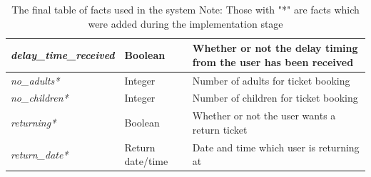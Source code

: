 \documentclass[11pt]{article}
\begin{document}
\begin{appendices}
\begin{table}[!ht]
{\begin{tabular}{|l|l|l|}
\textit{delay\_time\_received}  & Boolean                     & Whether or not the delay timing from the user has been received      \\ \hline
\textit{no\_adults*}            & Integer                     & Number of adults for ticket booking                                  \\ \hline
\textit{no\_children*}          & Integer                     & Number of children for ticket booking                                \\ \hline
\textit{returning*}             & Boolean                     & Whether or not the user wants a return ticket                        \\ \hline
\textit{return\_date*}          & Return date/time            & Date and time which user is returning at                             \\ \hline
\end{tabular}%
}
\caption{The final table of facts used in the system
Note: Those with "*" are facts which were added during the implementation stage}
\label{tab:REFacts}
\end{table}


\end{appendices}
\end{document}
